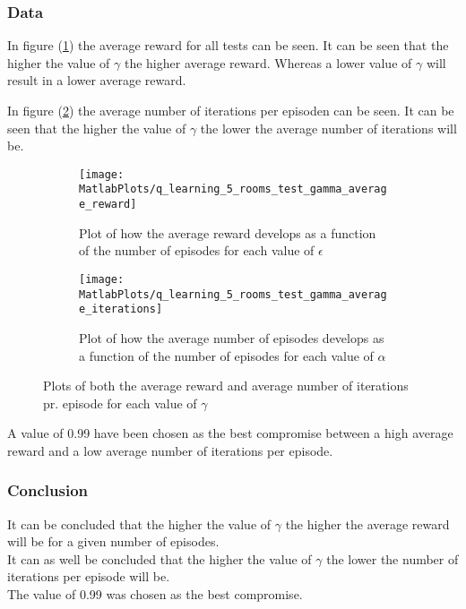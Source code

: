 \documentclass[../Head/Main.tex]{subfiles}
\begin{document}
\clearpage
\subsubsection*{Data}
In figure (\ref{fig:q-learn_gamma_reward}) the average reward for all tests can be seen. It can be seen that the higher the value of $\gamma$ the higher average reward. Whereas a lower value of $\gamma$ will result in a lower average reward.\par
In figure (\ref{fig:q-learn_gamma_iterations}) the average number of iterations per episoden can be seen. It can be seen that the higher the value of $\gamma$ the lower the average number of iterations will be.
\begin{figure}[H]
	\centering
	\begin{subfigure}[b]{0.49\textwidth}
		\centering
		\texttt{[image: MatlabPlots/q\_learning\_5\_rooms\_test\_gamma\_average\_reward]}
		\caption{Plot of how the average reward develops as a function of the number of episodes for each value of $\epsilon$}
		\label{fig:q-learn_gamma_reward}
	\end{subfigure}
	\hfill
	\begin{subfigure}[b]{0.49\textwidth}
		\centering
		\texttt{[image: MatlabPlots/q\_learning\_5\_rooms\_test\_gamma\_average\_iterations]}
		\caption{Plot of how the average number of episodes develops as a function of the number of episodes for each value of $\alpha$}
		\label{fig:q-learn_gamma_iterations}
	\end{subfigure}
	\caption{Plots of both the average reward and average number of iterations pr. episode for each value of $\gamma$}
	\label{fig:q-learn_gamma}
\end{figure}
A value of 0.99 have been chosen as the best compromise between a high average reward and a low average number of iterations per episode.

\subsubsection*{Conclusion}
It can be concluded that the higher the value of $\gamma$ the higher the average reward will be for a given number of episodes.\\
It can as well be concluded that the higher the value of $\gamma$ the lower the number of iterations per episode will be.\\ 
The value of 0.99 was chosen as the best compromise.
\end{document}
